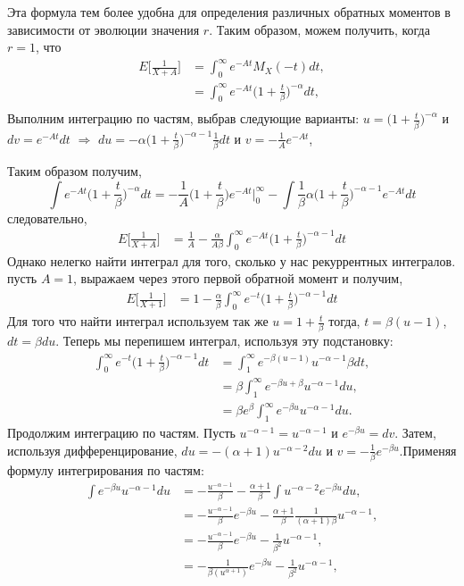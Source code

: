 \documentclass[13pt]{article}
\begin{document}
Эта формула тем более удобна для определения различных обратных моментов в зависимости от эволюции значения $r$. Таким образом, можем получить, когда $r=1$, что
\begin{align*}
    E\bigg[\frac{1}{X+A}\bigg] &=  \int_{0}^{\infty}e^{-At}M_{X}(-t)dt ,\\
    &= \int_{0}^{\infty} e^{-At} \Bigg(1 + \frac{t}{\beta} \Bigg)^{-\alpha} dt,\\
\end{align*}
Выполним интеграцию по частям, выбрав следующие варианты:
$u = \bigg(1 + \frac{t}{\beta} \bigg)^{-\alpha}$ и $dv= e^{-At}dt$ $\Longrightarrow$ $du=-\alpha \bigg(1 + \frac{t}{\beta} \bigg)^{-\alpha - 1}\frac{1}{\beta}dt$ и $v=-\frac{1}{A}e^{-At}$,

Таким образом получим,
\[
\int e^{-At}\bigg(1 + \frac{t}{\beta} \bigg)^{-\alpha} dt= -\frac{1}{A}\bigg(1 + \frac{t}{\beta} \bigg) e^{-At}\bigg|_{0}^{\infty} - \int \frac{1}{\beta}\alpha \bigg(1 + \frac{t}{\beta} \bigg)^{-\alpha-1}e^{-At}dt
\]
следовательно, 
\begin{align*}
    E\bigg[\frac{1}{X+A}\bigg] &= \frac{1}{A} - \frac{\alpha}{A\beta}\int_{0}^{\infty}e^{-At}\bigg(1 +  \frac{t}{\beta}\bigg)^{-\alpha-1}dt
\end{align*}
Однако нелегко найти интеграл для того, сколько у нас рекуррентных интегралов. пусть $A = 1$, выражаем через этого первой обратной момент и получим,
\begin{align*}
    E\bigg[\frac{1}{X+1}\bigg] &= 1 - \frac{\alpha}{\beta}\int_{0}^{\infty}e^{-t}\bigg(1 +  \frac{t}{\beta}\bigg)^{-\alpha-1}dt
\end{align*}
Для того что найти интеграл используем так же $u=1+\frac{t}{\beta}$ тогда, $t = \beta(u-1)$,$dt=\beta du$. Теперь мы перепишем интеграл, используя эту подстановку:
\begin{align*}
    \int_{0}^{\infty}e^{-t}\bigg(1 +  \frac{t}{\beta}\bigg)^{-\alpha-1}dt &= \int_{1}^{\infty}e^{-\beta(u-1)} u^{-\alpha -1}\beta dt, \\
    &=  \beta \int_{1}^{\infty} e^{-\beta u + \beta}u^{-\alpha -1 }du, \\
    &= \beta e^{\beta}\int_{1}^{\infty} e^{-\beta u}u^{-\alpha - 1}du.
\end{align*}
Продолжим интеграцию по частям. Пусть $u^{-\alpha -1 } = u ^{-\alpha -1}$ и $e^{-\beta u} = dv$. Затем, используя дифференцирование, $du= -(\alpha + 1)u^{-\alpha -2 }du$ и $v=-\frac{1}{\beta}e^{-\beta u}$.Применяя формулу интегрирования по частям:
\begin{align*}
 \int e^{-\beta u}u^{-\alpha - 1}du &= - \frac{u^{-\alpha -1}}{\beta}-\frac{\alpha + 1}{\beta}\int u^{-\alpha - 2}e^{-\beta u}du,\\ 
 &= -\frac{u^{-\alpha -1 }}{\beta}e^{-\beta u} - \frac{\alpha + 1}{\beta}\frac{1}{(\alpha + 1)\beta}u^{-\alpha - 1},\\
 &= -\frac{u^{-\alpha -1 }}{\beta}e^{-\beta u} - \frac{1}{\beta^{2}}u^{-\alpha - 1},\\
 &= -\frac{1}{\beta (u^{\alpha + 1})}e^{-\beta u} - \frac{1}{\beta^{2}}u^{-\alpha - 1},
\end{align*}
\end{document}
